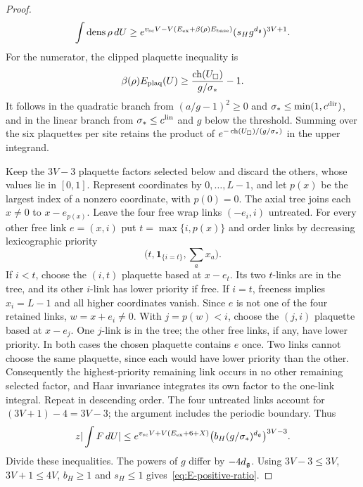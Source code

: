 \begin{proof}
\begin{equation*}
 \int\operatorname{dens}\rho\,dU\ge
 e^{v_{{\rm sc}}V-V(E_{\rm ex}+\beta(\rho)E_{\rm base})}
 (s_Hg^{d_{\mathfrak{g}}})^{3V+1}.
\end{equation*}
For the numerator, the clipped plaquette inequality is
\begin{equation*}
 \beta(\rho)E_{\rm plaq}(U)\ge
 \frac{\operatorname{ch}(U_\square)}{g/\sigma_*}-1.
\end{equation*}
It follows in the quadratic branch from $(a/g-1)^2\ge0$ and $\sigma_*\le\min(1,c^{\rm dir})$, and in the linear branch from $\sigma_*\le c^{\rm lin}$ and $g$ below the threshold. Summing over the six plaquettes per site retains the product of $e^{-\operatorname{ch}(U_\square)/(g/\sigma_*)}$ in the upper integrand.

Keep the $3V-3$ plaquette factors selected below and discard the others, whose values lie in $[0,1]$. Represent coordinates by $0,\ldots,L-1$, and let $p(x)$ be the largest index of a nonzero coordinate, with $p(0)=0$. The axial tree joins each $x\ne0$ to $x-e_{p(x)}$. Leave the four free wrap links $(-e_i,i)$ untreated. For every other free link $e=(x,i)$ put $t=\max\{i,p(x)\}$ and order links by decreasing lexicographic priority
\[
 \bigl(t,\mathbf 1_{\{i=t\}},\textstyle\sum_a x_a\bigr).
\]
If $i<t$, choose the $(i,t)$ plaquette based at $x-e_t$. Its two $t$-links are in the tree, and its other $i$-link has lower priority if free. If $i=t$, freeness implies $x_i=L-1$ and all higher coordinates vanish. Since $e$ is not one of the four retained links, $w=x+e_i\ne0$. With $j=p(w)<i$, choose the $(j,i)$ plaquette based at $x-e_j$. One $j$-link is in the tree; the other free links, if any, have lower priority. In both cases the chosen plaquette contains $e$ once. Two links cannot choose the same plaquette, since each would have lower priority than the other. Consequently the highest-priority remaining link occurs in no other remaining selected factor, and Haar invariance integrates its own factor to the one-link integral. Repeat in descending order. The four untreated links account for $(3V+1)-4=3V-3$; the argument includes the periodic boundary. Thus
\begin{equation*}
 z|\int F\,dU|\le
 e^{v_{{\rm sc}}V+V(E_{\rm ex}+6+X)}
 \bigl(b_H(g/\sigma_*)^{d_{\mathfrak{g}}}\bigr)^{3V-3}.
\end{equation*}
Divide these inequalities. The powers of $g$ differ by $-4d_{\mathfrak{g}}$. Using $3V-3\le3V$, $3V+1\le4V$, $b_H\ge1$ and $s_H\le1$ gives~\eqref{eq:E-positive-ratio}.


\end{proof}
